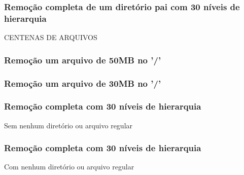 \documentclass{beamer}
\begin{document}
\begin{frame}
\frametitle{Remoção completa de um diretório pai com 30 níveis de hierarquia} 
CENTENAS DE ARQUIVOS
\justifying
\end{frame}




\begin{frame}
\frametitle{Remoção um arquivo de 50MB no '/'} 

\justifying
\end{frame}


\begin{frame}
\frametitle{Remoção um arquivo de 30MB no '/'} 

\justifying
\end{frame}

\begin{frame}
\frametitle{Remoção completa com 30 níveis de hierarquia} 
Sem nenhum diretório ou arquivo regular
\justifying
\end{frame}


\begin{frame}
\frametitle{Remoção completa com 30 níveis de hierarquia} 
Com nenhum diretório ou arquivo regular
\justifying
\end{frame}
\end{document}
